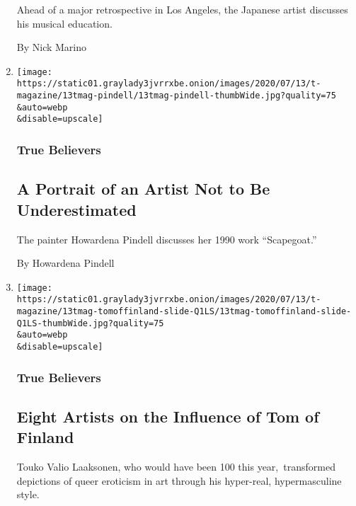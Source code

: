 \begin{enumerate}
  Ahead of a major retrospective in Los Angeles, the Japanese artist
  discusses his musical education.

  By Nick Marino
\item
  \href{/2020/07/24/t-magazine/howardena-pindell.html}{}

  \texttt{[image: https://static01.graylady3jvrrxbe.onion/images/2020/07/13/t-magazine/13tmag-pindell/13tmag-pindell-thumbWide.jpg?quality=75\\\&auto=webp\\\&disable=upscale]}

  \hypertarget{true-believers-1}{%
  \subsubsection{True Believers}\label{true-believers-1}}

  \hypertarget{a-portrait-of-an-artist-not-to-be-underestimated}{%
  \subsection{A Portrait of an Artist Not to Be
  Underestimated}\label{a-portrait-of-an-artist-not-to-be-underestimated}}

  The painter Howardena Pindell discusses her 1990 work ``Scapegoat.''

  By Howardena Pindell
\item
  \href{/2020/07/23/t-magazine/tom-of-finland.html}{}

  \texttt{[image: https://static01.graylady3jvrrxbe.onion/images/2020/07/13/t-magazine/13tmag-tomoffinland-slide-Q1LS/13tmag-tomoffinland-slide-Q1LS-thumbWide.jpg?quality=75\\\&auto=webp\\\&disable=upscale]}

  \hypertarget{true-believers-2}{%
  \subsubsection{True Believers}\label{true-believers-2}}

  \hypertarget{eight-artists-on-the-influence-of-tom-of-finland}{%
  \subsection{Eight Artists on the Influence of Tom of
  Finland}\label{eight-artists-on-the-influence-of-tom-of-finland}}

  Touko Valio Laaksonen, who would have been 100 this year,~transformed
  depictions of queer eroticism in art through his hyper-real,
  hypermasculine style.


\end{enumerate}
